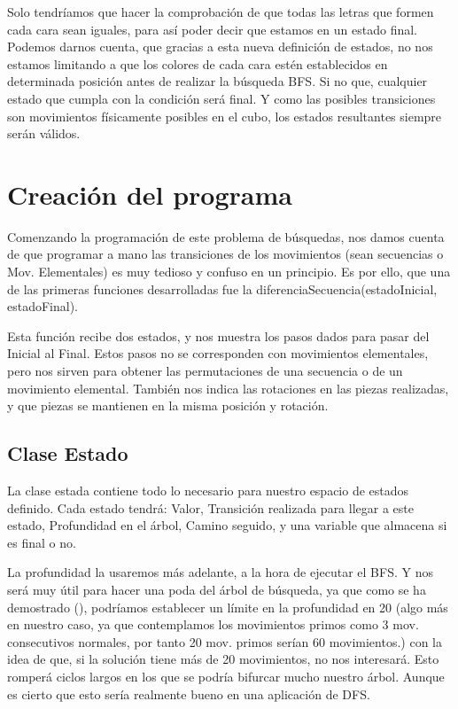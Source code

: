 \documentclass[11pt]{article}
\begin{document}
Solo tendríamos que hacer la comprobación de que todas las letras que formen cada cara sean iguales, para así poder decir que estamos en un estado final. Podemos darnos cuenta, que gracias a esta nueva definición de estados, no nos estamos limitando a que los colores de cada cara estén establecidos en determinada posición antes de realizar la búsqueda BFS. Si no que, cualquier estado que cumpla con la condición será final. Y como las posibles transiciones son movimientos físicamente posibles en el cubo, los estados resultantes siempre serán válidos.

\section{Creación del programa}

Comenzando la programación de este problema de búsquedas, nos damos cuenta de que programar a mano las transiciones de los movimientos (sean secuencias o Mov. Elementales) es muy tedioso y confuso en un principio. Es por ello, que una de las primeras funciones desarrolladas fue la diferenciaSecuencia(estadoInicial, estadoFinal). 
\newline

Esta función recibe dos estados, y nos muestra los pasos dados para pasar del Inicial al Final. Estos pasos no se corresponden con movimientos elementales, pero nos sirven para obtener las permutaciones de una secuencia o de un movimiento elemental. También nos indica las rotaciones en las piezas realizadas, y que piezas se mantienen en la misma posición y rotación.

\subsection{Clase Estado}

La clase estada contiene todo lo necesario para nuestro espacio de estados definido. Cada estado tendrá: Valor, Transición realizada para llegar a este estado, Profundidad en el árbol, Camino seguido, y una variable que almacena si es final o no. 
\newline

La profundidad la usaremos más adelante, a la hora de ejecutar el BFS. Y nos será muy útil para hacer una poda del árbol de búsqueda, ya que como se ha demostrado  (\cite{Gods Number}), podríamos establecer un límite en la profundidad en 20 (algo más en nuestro caso, ya que contemplamos los movimientos primos como 3 mov. consecutivos normales, por tanto 20 mov. primos serían 60 movimientos.) con la idea de que, si la solución tiene más de 20 movimientos, no nos interesará. Esto romperá ciclos largos en los que se podría bifurcar mucho nuestro árbol. Aunque es cierto que esto sería realmente bueno en una aplicación de DFS.
\newline 
\end{document}
